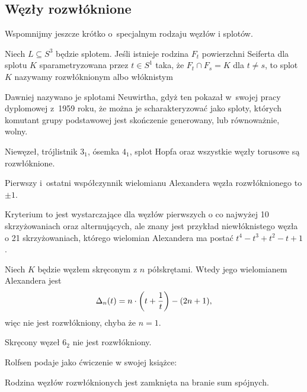 \subsection{Węzły rozwłóknione}
Wspomnijmy jeszcze krótko o~specjalnym rodzaju węzłów i splotów.

\begin{definition}
    Niech $L \subseteq S^3$ będzie splotem.
    Jeśli istnieje rodzina $F_t$ powierzchni Seiferta dla splotu $K$ sparametryzowana przez $t \in S^1$ taka, że $F_t \cap F_s = K$ dla $t \neq s$, to splot $K$ nazywamy rozwłóknionym albo włóknistym
\end{definition}

Dawniej nazywano je splotami Neuwirtha, gdyż ten pokazał w~swojej pracy dyplomowej z~1959 roku, że można je scharakteryzować jako sploty, których komutant grupy podstawowej jest skończenie generowany, lub równoważnie, wolny.

\begin{example}
    Niewęzeł, trójlistnik $3_1$, ósemka $4_1$, splot Hopfa oraz wszystkie węzły torusowe są rozwłóknione.
\end{example}

\begin{proposition}
    Pierwszy i~ostatni współczynnik wielomianu Alexandera węzła rozwłóknionego to $\pm 1$.
\end{proposition}

Kryterium to jest wystarczające dla węzłów pierwszych o co najwyżej 10 skrzyżowaniach oraz alternujących, ale znany jest przykład niewłóknistego węzła o 21 skrzyżowaniach, którego wielomian Alexandera ma postać $t^4 - t^3 + t^2 - t +1$.

\begin{proposition}
%
    Niech $K$ będzie węzłem skręconym z $n$ półskrętami.
    Wtedy jego wielomianem Alexandera jest
    \begin{equation}
        \Delta_n(t) = n \cdot \left(t + \frac 1 t\right)  - (2n+1),
    \end{equation}
    więc nie jest rozwłókniony, chyba że $n = 1$.
\end{proposition}

\begin{corollary}
    Skręcony węzeł $6_2$ nie jest rozwłókniony.
\end{corollary}

Rolfsen \cite[s. 326]{rolfsen76} podaje jako ćwiczenie w swojej książce:

\begin{proposition}
    Rodzina węzłów rozwłóknionych jest zamknięta na branie sum spójnych.
\end{proposition}



